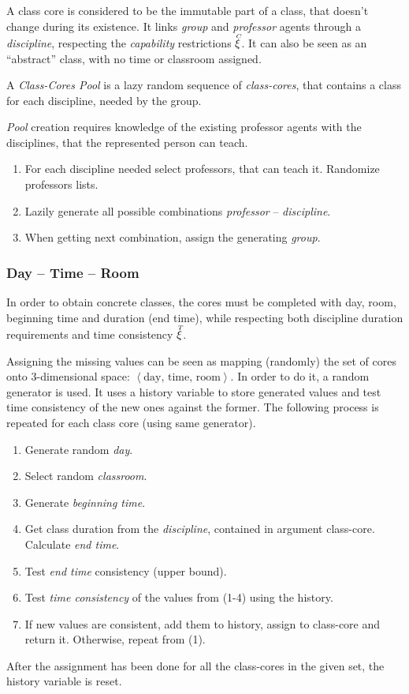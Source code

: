 \documentclass[../../ThesisDoc]{subfiles}
\begin{document}
A class core is considered to be the immutable part of a class, that doesn't
change during its existence. It links \emph{group} and \emph{professor} agents
through a \emph{discipline}, respecting the \emph{capability} restrictions $\accentset{C}{\xi}$.
It can also be seen as an ``abstract'' class, with no time or classroom assigned.

A \emph{Class-Cores Pool} is a lazy random sequence of \emph{class-cores},
that contains a class for each discipline, needed by the group.

\emph{Pool} creation requires knowledge of the existing professor agents with
the disciplines, that the represented person can teach.
\begin{enumerate}
  \item For each discipline needed select professors, that can teach it.
        Randomize professors lists.
  \item Lazily generate all possible combinations \emph{professor} -- \emph{discipline}.
  \item When getting next combination, assign the generating \emph{group}.
\end{enumerate}

\subsubsection{Day -- Time -- Room}
\label{sec:solution-DTR}

In order to obtain concrete classes, the cores must be completed with day, room,
beginning time and duration (end time), while respecting both discipline duration
requirements and time consistency $\accentset{T}{\xi}$.

Assigning the missing values can be seen as mapping (randomly) the set of cores onto
3-dimensional space: $\left< \text{day, time, room} \right>$.
In order to do it, a random generator is used. It uses a history variable to
store generated values and test time consistency of the new ones against the former.
The following process is repeated for each class core (using same generator).
\begin{enumerate}
  \item Generate random \emph{day}.
  \item Select random \emph{classroom}.
  \item Generate \emph{beginning time}.
  \item Get class duration from the \emph{discipline}, contained in argument class-core.
        Calculate \emph{end time}.
  \item Test \emph{end time} consistency (upper bound).
  \item Test \emph{time consistency} of the values from (1-4) using the history.
  \item If new values are consistent, add them to history, assign to class-core
        and return it.
        Otherwise, repeat from (1).

\end{enumerate}
After the assignment has been done for all the class-cores in the given set,
the history variable is reset.
\end{document}
